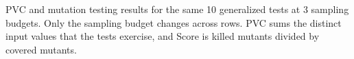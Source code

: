 \begin{table}
  \caption{PVC and mutation testing results for the same 10 generalized tests at 3 sampling budgets. Only the sampling budget changes across rows. PVC sums the distinct input values that the tests exercise, and Score is killed mutants divided by covered mutants.}
  \label{tab:jarvis-pvc-budget}
  \centering
  
\end{table}
